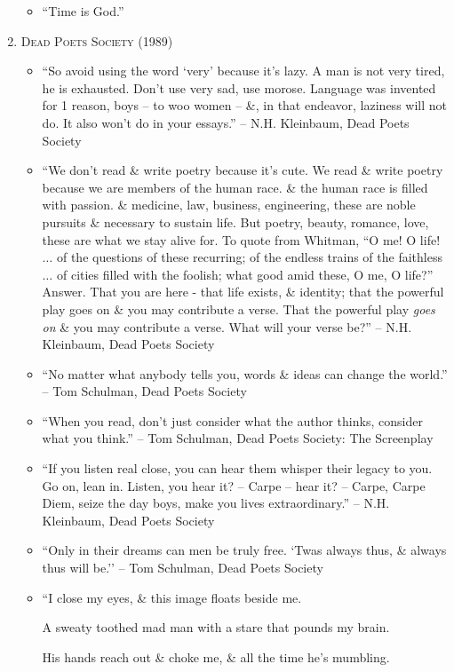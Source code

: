 \documentclass{article}
\begin{document}
\begin{enumerate}
\begin{itemize}
		\item ``Time is God.''
	\end{itemize}	
	\item \textsc{Dead Poets Society} (1989)
	\begin{itemize}
		\item ``So avoid using the word `very' because it's lazy. A man is not very tired, he is exhausted. Don't use very sad, use morose. Language was invented for 1 reason, boys -- to woo women -- \&, in that endeavor, laziness will not do. It also won't do in your essays.'' --  N.H. Kleinbaum, Dead Poets Society
		\item ``We don't read \& write poetry because it's cute. We read \& write poetry because we are members of the human race. \& the human race is filled with passion. \& medicine, law, business, engineering, these are noble pursuits \& necessary to sustain life. But poetry, beauty, romance, love, these are what we stay alive for. To quote from Whitman, ``O me! O life! $\ldots$ of the questions of these recurring; of the endless trains of the faithless $\ldots$ of cities filled with the foolish; what good amid these, O me, O life?'' Answer. That you are here - that life exists, \& identity; that the powerful play goes on \& you may contribute a verse. That the powerful play \emph{goes on} \& you may contribute a verse. What will your verse be?'' --  N.H. Kleinbaum, Dead Poets Society
		\item ``No matter what anybody tells you, words \& ideas can change the world.'' -- Tom Schulman, Dead Poets Society
		\item ``When you read, don't just consider what the author thinks, consider what you think.'' --  Tom Schulman, Dead Poets Society: The Screenplay
		\item ``If you listen real close, you can hear them whisper their legacy to you. Go on, lean in. Listen, you hear it? -- Carpe -- hear it? -- Carpe, Carpe Diem, seize the day boys, make you lives extraordinary.'' -- N.H. Kleinbaum, Dead Poets Society
		\item ``Only in their dreams can men be truly free. `Twas always thus, \& always thus will be.'' -- Tom Schulman, Dead Poets Society
		\item ``I close my eyes, \& this image floats beside me.
		
		A sweaty toothed mad man with a stare that pounds my brain.
		
		His hands reach out \& choke me, \& all the time he's mumbling.
		

\end{itemize}
\end{enumerate}
\end{document}
